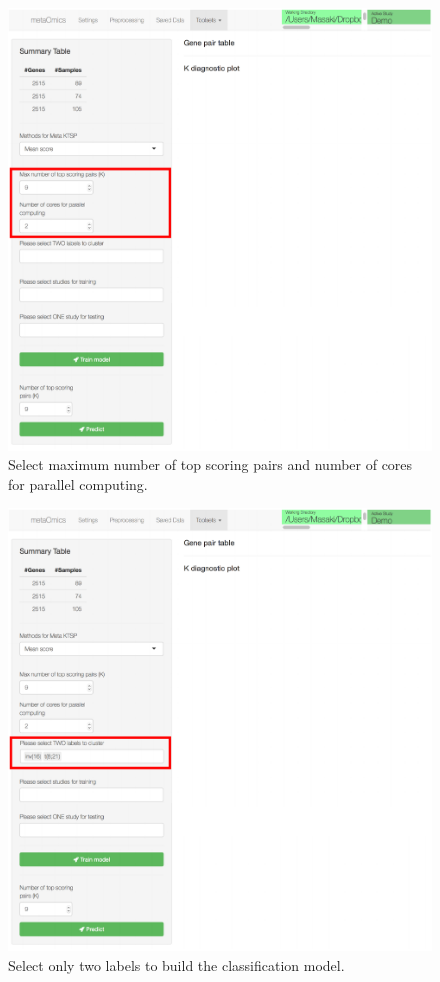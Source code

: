 \begin{figure}[H]
\begin{center}
\includegraphics[scale=0.7]{./figure/MetaKTSP/Figure6.pdf}
\caption{Select maximum number of top scoring pairs and number of cores for parallel computing.}
\label{fig:NumK}
\end{center}
\end{figure}

\begin{figure}[H]
\begin{center}
\includegraphics[scale=0.7]{./figure/MetaKTSP/Figure7.pdf}
\caption{Select only two labels to build the classification model.}
\label{fig:TwoLabels}
\end{center}
\end{figure}

